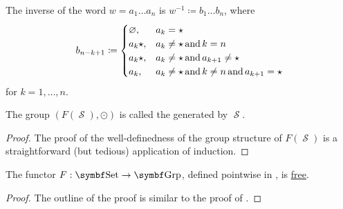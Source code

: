 \begin{definition}
  The inverse of the word \( w = a_1 \ldots a_n \) is \( w^{-1} \coloneqq b_1 \ldots b_n \), where
   \begin{equation}\label{eq:def:free_group/inverse}
     b_{n-k+1} \coloneqq \begin{cases}
       \varnothing, &a_k = {\star} \\
       a_k{\star},  &a_k \neq {\star} \mathop{\text{and}} k = n \\
       a_k{\star},  &a_k \neq {\star} \mathop{\text{and}} a_{k+1} \neq {\star} \\
       a_k,         &a_k \neq {\star} \mathop{\text{and}} k \neq n \mathop{\text{and}} a_{k+1} = {\star} \\
     \end{cases}
   \end{equation}
   for \( k = 1, \ldots, n \).

  The group \( (F(\mscrS), \odot) \) is called the  generated by \( \mscrS \).
\end{definition}
\begin{proof}
  The proof of the well-definedness of the group structure of \( F(\mscrS) \) is a straightforward (but tedious) application of induction\IND.
\end{proof}

\begin{proposition}\label{thm:free_group_is_free_functor}
  The functor \( F: \Cat{Set} \to \Cat{Grp} \), defined pointwise in , is \hyperref[def:free_functor]{free}.
\end{proposition}
\begin{proof}
  The outline of the proof is similar to the proof of .
\end{proof}

